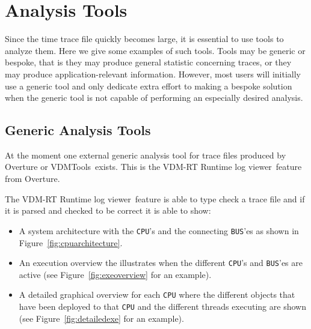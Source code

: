 \documentclass{overturerepchap}
\newcommand{\VDMTools}{VDMTools}
\newcommand{\showtrace}{VDM-RT Runtime log viewer}
\begin{document}
\section{Analysis Tools}

Since the time trace file quickly becomes large, it is essential to
use tools to analyze them. Here we give some examples of such
tools. Tools may be generic or bespoke, that is they may produce
general statistic concerning traces, or they may produce
application-relevant information. However, most users will initially
use a generic tool and only dedicate extra effort to making a bespoke
solution when the generic tool is not capable of performing an especially
desired analysis.

\subsection{Generic Analysis Tools}

At the moment one external generic analysis tool for trace files produced by
Overture or
\VDMTools\ exists. This is the \showtrace\ feature from Overture.

The \showtrace\ feature is able to type check a trace file and if it 
is parsed and checked to be correct it is able to show:

\begin{itemize}
\item A system architecture with the \texttt{CPU}'s and the connecting
      \texttt{BUS}'es as shown in Figure~\ref{fig:cpuarchitecture}.
\item An execution overview the illustrates when the different 
      \texttt{CPU}'s and \texttt{BUS}'es are active (see 
      Figure~\ref{fig:exeoverview} for an example).
\item A detailed graphical overview for each \texttt{CPU} where the
      different objects that have been deployed to that \texttt{CPU} and
      the different threads executing are shown (see 
      Figure~\ref{fig:detailedexe} for an example).
\end{itemize}
\end{document}
